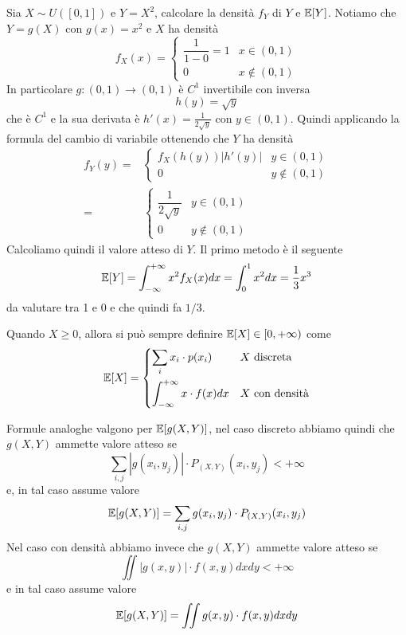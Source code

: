 \begin{example}
	Sia $X \sim U([0,1])$ e $Y = X^2$, calcolare la densità $f_Y$ di $Y$ e $\mathbb{E}[Y]$. Notiamo che
	$Y = g(X)$ con $g(x) = x^2$ e $X$ ha densità
	\[
		f_X(x) = \begin{cases}
			\dfrac{1}{1-0} = 1 & x \in (0,1)    \\
			0                  & x \notin (0,1)
		\end{cases}
	\]
	In particolare $g : (0,1) \to (0,1)$ è $C^1$ invertibile con inversa
	\[ h(y) = \sqrt{y} \]
	che è $C^1$ e la sua derivata è $h'(x) = \frac{1}{2 \sqrt{y}}$ con $y \in (0,1)$. Quindi
	applicando la formula del cambio di variabile ottenendo che $Y$ ha densità
	\begin{align*}
		f_Y (y) = & \begin{cases}
			            f_X (h(y)) |h'(y)| & y \in (0,1)    \\
			            0                  & y \notin (0,1)
		            \end{cases}                  \\
		=         & \begin{cases}
			            \dfrac{1}{2 \sqrt{y}} & y \in (0,1)    \\
			            0                     & y \notin (0,1)
		            \end{cases}
	\end{align*}
	Calcoliamo quindi il valore atteso di $Y$. Il primo metodo è il seguente
	\[ \mathbb{E}[Y] = \int_{-\infty}^{+\infty} x^2 f_X (x) dx = \int_0^1 x^2 dx = \frac{1}{3} x^3 \]
	da valutare tra 1 e 0 e che quindi fa $1/3$.
\end{example}

\begin{observation}
	Quando $X \geq 0$, allora si può sempre definire $\mathbb{E}[X] \in [0, +\infty)$ come
	\[
		\mathbb{E}[X] = \begin{cases}
			\displaystyle\sum_i x_i \cdot p(x_i)                  & X \text{ discreta}    \\[3ex]
			\displaystyle\int_{-\infty}^{+\infty} x \cdot f(x) dx & X \text{ con densità}
		\end{cases}
	\]
\end{observation}

\begin{observation}
	Formule analoghe valgono per $\mathbb{E}[g(X,Y)]$, nel caso discreto abbiamo quindi che $g(X, Y)$
	ammette valore atteso se
	\[ \sum_{i,j} |g(x_i, y_j)| \cdot P_{(X,Y)} (x_i, y_j) < +\infty \]
	e, in tal caso assume valore
	\[ \mathbb{E}[g(X,Y)] = \sum_{i,j} g(x_i, y_j) \cdot P_{(X,Y)} (x_i, y_j) \]
	Nel caso con densità abbiamo invece che $g(X,Y)$ ammette valore atteso se
	\[ \iint |g(x,y)| \cdot f (x,y) dx dy < +\infty \]
	e in tal caso assume valore
	\[ \mathbb{E}[g(X, Y)] = \iint g(x, y) \cdot f(x,y) dx dy \]
\end{observation}

